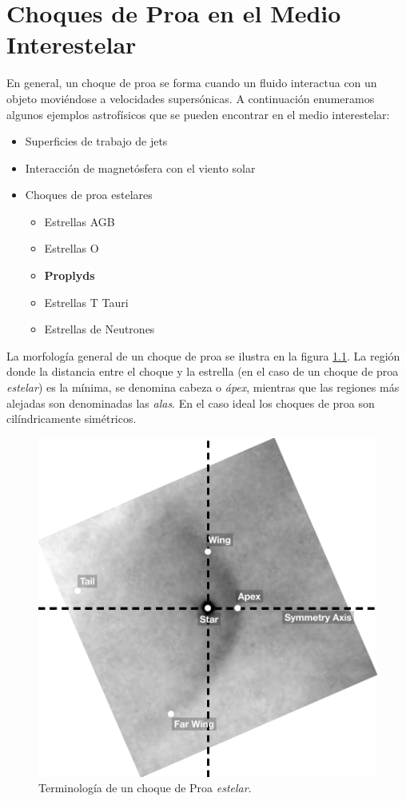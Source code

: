 \chapter[Choques de Proa]{Choques de Proa en el Medio Interestelar}
\label{chap:bow-shocks}
\thispagestyle{empty}

En general, un choque de proa se forma cuando un fluido interactua con un objeto moviéndose a velocidades supersónicas. A continuación enumeramos algunos ejemplos astrofísicos que se pueden encontrar en el medio interestelar:

\begin{itemize}
\item Superficies de trabajo de jets
\item Interacción de magnetósfera con el viento solar
\item Choques de proa estelares
  \begin{itemize}
  \item Estrellas AGB
  \item Estrellas O
  \item \textbf{Proplyds}
  \item Estrellas T Tauri
  \item Estrellas de Neutrones
  \end{itemize}
\end{itemize}

La morfología general de un choque de proa se ilustra en la figura \ref{fig:terminology}. La región donde la distancia entre el choque y la estrella (en el caso de un choque de proa \textit{estelar}) es la mínima, se denomina cabeza o \textit{ápex}, mientras que las regiones más alejadas son denominadas las \textit{alas}. En el caso ideal los choques de proa son cilíndricamente simétricos.

\begin{figure}
  \centering
  \includegraphics[width=0.5\linewidth]{./Figures/bow-terminology}
  \caption{Terminología de un choque de Proa \textit{estelar}.}
  \label{fig:terminology}
\end{figure}

